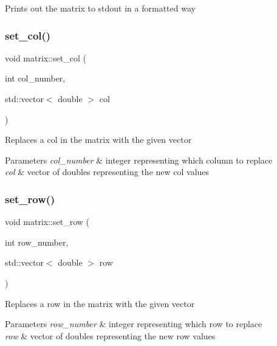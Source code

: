 Prints out the matrix to stdout in a formatted way \mbox{\label{classmatrix_a976c7dba1c9f40d6c129067fd4c5afc1}} 
\subsubsection{\texorpdfstring{set\+\_\+col()}{set\_col()}}
{\footnotesize\ttfamily void matrix\+::set\+\_\+col (\begin{DoxyParamCaption}\item[{int}]{col\+\_\+number,  }\item[{std\+::vector$<$ double $>$}]{col }\end{DoxyParamCaption})}

Replaces a col in the matrix with the given vector 
\begin{DoxyParams}{Parameters}
{\em col\+\_\+number} & integer representing which column to replace \\
\hline
{\em col} & vector of doubles representing the new col values \\
\hline
\end{DoxyParams}
\mbox{\label{classmatrix_a2e865089f895c8a84c37818cf75ca215}} 
\subsubsection{\texorpdfstring{set\+\_\+row()}{set\_row()}}
{\footnotesize\ttfamily void matrix\+::set\+\_\+row (\begin{DoxyParamCaption}\item[{int}]{row\+\_\+number,  }\item[{std\+::vector$<$ double $>$}]{row }\end{DoxyParamCaption})}

Replaces a row in the matrix with the given vector 
\begin{DoxyParams}{Parameters}
{\em row\+\_\+number} & integer representing which row to replace \\
\hline
{\em row} & vector of doubles representing the new row values \\
\hline
\end{DoxyParams}
\mbox{\label{classmatrix_a159c12c74a7a58596e297a29094eb1f9}} 
